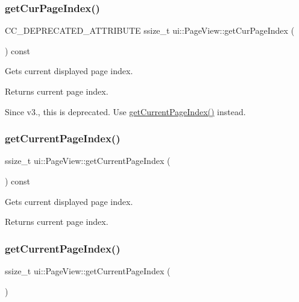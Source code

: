 \subsubsection{\texorpdfstring{get\+Cur\+Page\+Index()}{getCurPageIndex()}\hspace{0.1cm}{\footnotesize\ttfamily [2/2]}}
{\footnotesize\ttfamily C\+C\+\_\+\+D\+E\+P\+R\+E\+C\+A\+T\+E\+D\+\_\+\+A\+T\+T\+R\+I\+B\+U\+TE ssize\+\_\+t ui\+::\+Page\+View\+::get\+Cur\+Page\+Index (\begin{DoxyParamCaption}{ }\end{DoxyParamCaption}) const}

Gets current displayed page index. \begin{DoxyReturn}{Returns}
current page index.
\end{DoxyReturn}
Since v3., this is deprecated. Use {\ttfamily \hyperlink{classui_1_1PageView_a0e0e1e05f1804d2b633ce7fb1ac16c6d}{get\+Current\+Page\+Index()}} instead. \mbox{\label{classui_1_1PageView_aad39bcc516543dbd0b8bbf1b57bd2e98}} 
\subsubsection{\texorpdfstring{get\+Current\+Page\+Index()}{getCurrentPageIndex()}\hspace{0.1cm}{\footnotesize\ttfamily [1/2]}}
{\footnotesize\ttfamily ssize\+\_\+t ui\+::\+Page\+View\+::get\+Current\+Page\+Index (\begin{DoxyParamCaption}{ }\end{DoxyParamCaption}) const\hspace{0.3cm}{\ttfamily [inline]}}

Gets current displayed page index. \begin{DoxyReturn}{Returns}
current page index. 
\end{DoxyReturn}
\mbox{\label{classui_1_1PageView_a0e0e1e05f1804d2b633ce7fb1ac16c6d}} 
\subsubsection{\texorpdfstring{get\+Current\+Page\+Index()}{getCurrentPageIndex()}\hspace{0.1cm}{\footnotesize\ttfamily [2/2]}}
{\footnotesize\ttfamily ssize\+\_\+t ui\+::\+Page\+View\+::get\+Current\+Page\+Index (\begin{DoxyParamCaption}{ }\end{DoxyParamCaption})}

